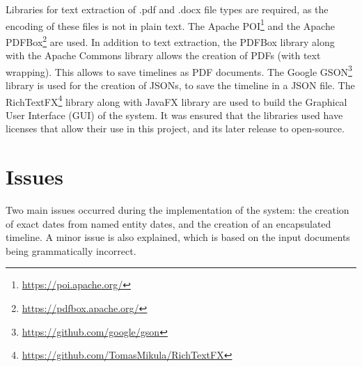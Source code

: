 \par Libraries for text extraction of .pdf and .docx file types are required, as the encoding of these files is not in plain text. The Apache POI\footnote{\url{https://poi.apache.org/}} and the Apache PDFBox\footnote{\url{https://pdfbox.apache.org/}} are used. In addition to text extraction, the PDFBox library along with the Apache Commons library allows the creation of PDFs (with text wrapping). This allows to save timelines as PDF documents. The Google GSON\footnote{\url{https://github.com/google/gson}} library is used for the creation of JSONs, to save the timeline in a JSON file. The RichTextFX\footnote{\url{https://github.com/TomasMikula/RichTextFX}} library along with JavaFX library are used to build the Graphical User Interface (GUI) of the system. It was ensured that the libraries used have licenses that allow their use in this project, and its later release to open-source.

\section{Issues}
\par Two main issues occurred during the implementation of the system: the creation of exact dates from named  entity dates, and the creation of an encapsulated timeline. A minor issue is also explained, which is based on the input documents being grammatically incorrect.

